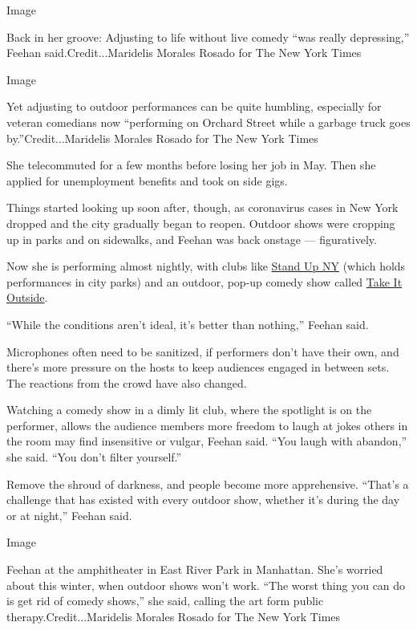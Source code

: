 Image

Back in her groove: Adjusting to life without live comedy ``was really
depressing,'' Feehan said.Credit...Maridelis Morales Rosado for The New
York Times

Image

Yet adjusting to outdoor performances can be quite humbling, especially
for veteran comedians now ``performing on Orchard Street while a garbage
truck goes by.''Credit...Maridelis Morales Rosado for The New York Times

She telecommuted for a few months before losing her job in May. Then she
applied for unemployment benefits and took on side gigs.

Things started looking up soon after, though, as coronavirus cases in
New York dropped and the city gradually began to reopen. Outdoor shows
were cropping up in parks and on sidewalks, and Feehan was back onstage
--- figuratively.

Now she is performing almost nightly, with clubs like
\href{https://www.nytimes3xbfgragh.onion/2020/08/26/arts/television/live-comedy-new-york.html}{Stand
Up NY} (which holds performances in city parks) and an outdoor, pop-up
comedy show called
\href{https://www.instagram.com/takeitoutsidecomedy/}{Take It Outside}.

``While the conditions aren't ideal, it's better than nothing,'' Feehan
said.

Microphones often need to be sanitized, if performers don't have their
own, and there's more pressure on the hosts to keep audiences engaged in
between sets. The reactions from the crowd have also changed.

Watching a comedy show in a dimly lit club, where the spotlight is on
the performer, allows the audience members more freedom to laugh at
jokes others in the room may find insensitive or vulgar, Feehan said.
``You laugh with abandon,'' she said. ``You don't filter yourself.''

Remove the shroud of darkness, and people become more apprehensive.
``That's a challenge that has existed with every outdoor show, whether
it's during the day or at night,'' Feehan said.

Image

Feehan at the amphitheater in East River Park in Manhattan. She's
worried about this winter, when outdoor shows won't work. ``The worst
thing you can do is get rid of comedy shows,'' she said, calling the art
form public therapy.Credit...Maridelis Morales Rosado for The New York
Times

